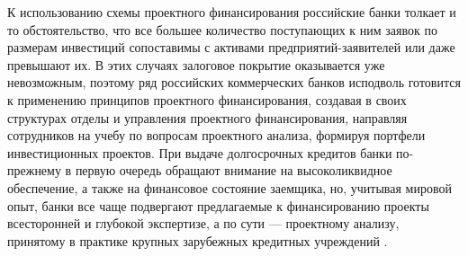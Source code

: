 К использованию схемы проектного финансирования российские банки толкает и то обстоятельство, что все большее количество поступающих к ним заявок по размерам инвестиций сопоставимы с активами предприятий-заявителей или даже превышают их.
В этих случаях залоговое покрытие оказывается уже невозможным, поэтому ряд российских коммерческих банков исподволь готовится к применению принципов проектного финансирования, создавая в своих структурах отделы и управления проектного финансирования, направляя сотрудников на учебу по вопросам проектного анализа, формируя портфели инвестиционных проектов.
При выдаче долгосрочных кредитов банки по-прежнему в первую очередь обращают внимание на высоколиквидное обеспечение, а также на финансовое состояние заемщика, но, учитывая мировой опыт, банки все чаще подвергают предлагаемые к финансированию проекты всесторонней и глубокой экспертизе, а по сути --- проектному анализу, принятому в практике крупных зарубежных кредитных учреждений \cite[303--306]{mazur}.